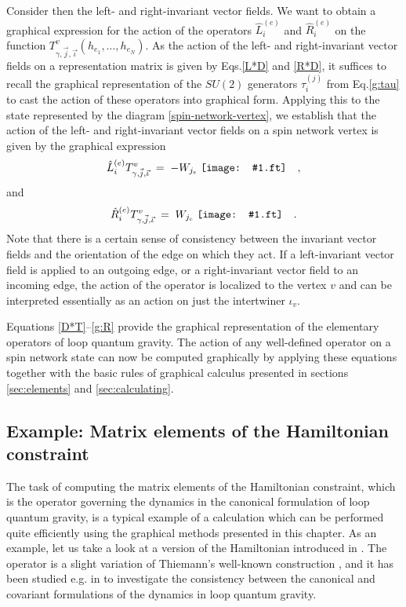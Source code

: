 \documentclass[graybox, secnum]{svmult}
\makeatletter
\newcommand{\ft}{pdf}        %
\newcommand{\makeSymbol}[1]{\mathord{\vcenter{\hbox{#1}}}}
\newcommand{\Symbol}[1]{\makeSymbol{\texttt{[image: \#1.\\ft]}}}
\newcommand{\eg}{e.g.\@\xspace}
\newcommand{\Eq}[1]{Eq.\@\xspace\eqref{#1}}
\newcommand{\Eqs}[1]{Eqs.\@\xspace\eqref{#1}}
\makeatother
\begin{document}
Consider then the left- and right-invariant vector fields. We want to obtain a graphical expression for the action of the operators $\hat L_i^{(e)}$ and $\hat R_i^{(e)}$ on the function $T_{\gamma, \vec j, \vec\iota}^v(h_{e_1}, \dots, h_{e_N})$. As the action of the left- and right-invariant vector fields on a representation matrix is given by \Eqs{L*D} and \eqref{R*D}, it suffices to recall the graphical representation of the $SU(2)$ generators $\tau_i^{(j)}$ from \Eq{g:tau} to cast the action of these operators into graphical form. Applying this to the state represented by the diagram \eqref{spin-network-vertex}, we establish that the action of the left- and right-invariant vector fields on a spin network vertex is given by the graphical expression
\begin{equation}
	\hat L_i^{(e)} T_{\gamma, \vec j, \vec\iota}^v \; = \; -W_{j_e} \; \Symbol{L-action} \quad ,
	\label{g:L}
\end{equation}
and
\begin{equation}
	\hat R_i^{(e)} T_{\gamma, \vec j, \vec\iota}^v \; = \; W_{j_e} \; \Symbol{R-action} \quad .
	\label{g:R}
\end{equation}
Note that there is a certain sense of consistency between the invariant vector fields and the orientation of the edge on which they act. If a left-invariant vector field is applied to an outgoing edge, or a right-invariant vector field to an incoming edge, the action of the operator is localized to the vertex $v$ and can be interpreted essentially as an action on just the intertwiner $\iota_v$.

Equations \eqref{D*T}--\eqref{g:R} provide the graphical representation of the elementary operators of loop quantum gravity. The action of any well-defined operator on a spin network state can now be computed graphically by applying these equations together with the basic rules of graphical calculus presented in sections \ref{sec:elements} and \ref{sec:calculating}.

\subsection{Example: Matrix elements of the Hamiltonian constraint}

The task of computing the matrix elements of the Hamiltonian constraint, which is the operator governing the dynamics in the canonical formulation of loop quantum gravity, is a typical example of a calculation which can be performed quite efficiently using the graphical methods presented in this chapter. As an example, let us take a look at a version of the Hamiltonian introduced in \cite{Yang:2015zda}. The operator is a slight variation of Thiemann's well-known construction \cite{Thiemann:1996aw}, and it has been studied \eg in \cite{Yang:2021den} to investigate the consistency between the canonical and covariant formulations of the dynamics in loop quantum gravity.
\end{document}
